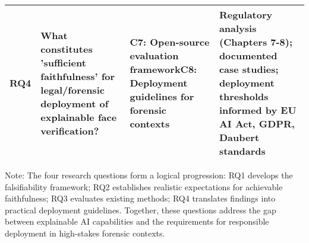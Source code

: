\begin{table}[htbp]
\begin{tabularx}{\textwidth}{>{\centering\arraybackslash}p{}X>{\raggedright\arraybackslash}p{}>{\raggedright\arraybackslash}p{}}
\textbf{RQ4} & What constitutes 'sufficient faithfulness' for legal/forensic deployment of explainable face verification? & \textbf{C7:} Open-source evaluation framework\newline\textbf{C8:} Deployment guidelines for forensic contexts & Regulatory analysis (Chapters 7-8); documented case studies; deployment thresholds informed by EU AI Act, GDPR, Daubert standards \\
\bottomrule
\end{tabularx}
\begin{tablenotes}
\small
\item Note: The four research questions form a logical progression: RQ1 develops the falsifiability framework; RQ2 establishes realistic expectations for achievable faithfulness; RQ3 evaluates existing methods; RQ4 translates findings into practical deployment guidelines. Together, these questions address the gap between explainable AI capabilities and the requirements for responsible deployment in high-stakes forensic contexts.
\end{tablenotes}
\end{table}

